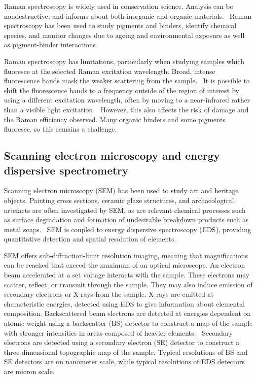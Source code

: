 Raman spectroscopy is widely used in conservation science. Analysis can be nondestructive, and informs about both inorganic and organic materials.~\autocite{conti_2016} Raman spectroscopy has been used to study pigments and binders, identify chemical species, and monitor changes due to ageing and environmental exposure as well as pigment-binder interactions.~\autocite{conti_2016, matousek_tissue, tomasini_raman, pallipurath2014, pallipurath2013, lazzari, vandenabeele} 

Raman spectroscopy has limitations, particularly when studying samples which fluoresce at the selected Raman excitation wavelength. Broad, intense fluorescence bands mask the weaker scattering from the sample.~\autocite{Wei} It is possible to shift the fluorescence bands to a frequency outside of the region of interest by using a different excitation wavelength, often by moving to a near-infrared rather than a visible light excitation.~\autocite{Kaszowska,Mancini} However, this also affects the risk of damage and the Raman efficiency observed. Many organic binders and some pigments fluoresce, so this remains a challenge. 


\subsection[Scanning electron microscopy and energy dispersive spectrometry]{Scanning electron microscopy and energy dispersive spectrometry}
\label{subsection1.2.2}

Scanning electron microscopy (SEM) has been used to study art and heritage objects. Painting cross sections, ceramic glaze structures, and archaeological artefacts are often investigated by SEM, as are relevant chemical processes such as surface degradation and formation of undesirable breakdown products such as metal soaps.~\autocite{Lazzara, Hermans, Pradell, Schreiner} SEM is coupled to energy dispersive spectroscopy (EDS), providing quantitative detection and spatial resolution of elements.

SEM offers sub-diffraction-limit resolution imaging, meaning that magnifications can be reached that exceed the maximum of an optical microscope. An electron beam accelerated at a set voltage interacts with the sample. These electrons may scatter, reflect, or transmit through the sample. They may also induce emission of secondary electrons or X-rays from the sample. X-rays are emitted at characteristic energies, detected using EDS to give information about elemental composition. Backscattered beam electrons are detected at energies dependent on atomic weight using a backscatter (BS) detector to construct a map of the sample with stronger intensities in areas composed of heavier elements.~\autocite{Lazzara,Pradell,Schreiner} Secondary electrons are detected using a secondary electron (SE) detector to construct a three-dimensional topographic map of the sample. Typical resolutions of BS and SE detectors are on nanometer scale, while typical resolutions of EDS detectors are micron scale.~\autocite{Lazzara}

